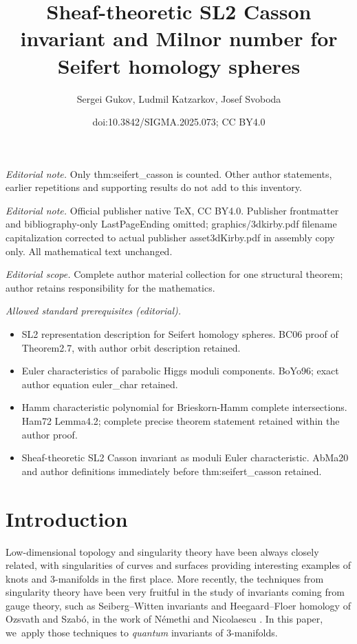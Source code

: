 \documentclass[10pt,a4paper]{amsart}
\title{Sheaf-theoretic SL2 Casson invariant and Milnor number for Seifert homology spheres}
\author{Sergei Gukov, Ludmil Katzarkov, Josef Svoboda}
\date{doi:10.3842/SIGMA.2025.073; CC BY4.0}
\begin{document}
\maketitle
\noindent\textit{Editorial note.} Only thm:seifert\_casson is counted. Other author statements, earlier repetitions and supporting results do not add to this inventory.\par\medskip
\noindent\textit{Editorial note.} Official publisher native TeX, CC BY4.0. Publisher frontmatter and bibliography-only LastPageEnding omitted; graphics/3dkirby.pdf filename capitalization corrected to actual publisher asset3dKirby.pdf in assembly copy only. All mathematical text unchanged.\par\medskip
\noindent\textit{Editorial scope.} Complete author material collection for one structural theorem; author retains responsibility for the mathematics.\par\medskip
\noindent\textit{Allowed standard prerequisites (editorial).}\begin{itemize}
\item SL2 representation description for Seifert homology spheres. BC06 proof of Theorem2.7, with author orbit description retained.
\item Euler characteristics of parabolic Higgs moduli components. BoYo96; exact author equation euler\_char retained.
\item Hamm characteristic polynomial for Brieskorn-Hamm complete intersections. Ham72 Lemma4.2; complete precise theorem statement retained within the author proof.
\item Sheaf-theoretic SL2 Casson invariant as moduli Euler characteristic. AbMa20 and author definitions immediately before thm:seifert\_casson retained.
\end{itemize}\medskip
\section{Introduction}\label{sec:intro}

Low-dimensional topology and singularity theory have been always closely related, with singularities of curves and surfaces providing interesting examples of knots and 3-manifolds in the first place. More recently, the techniques from singularity theory have been very fruitful in the study of invariants coming from gauge theory, such as Seiberg--Witten invariants and Heegaard--Floer homology of Ozsvath and Szab\'o, in the work of N\'emethi and Nicolaescu \cite{NeNi02}. In this paper, we~apply those techniques to \emph{quantum} invariants of 3-manifolds.
\end{document}
